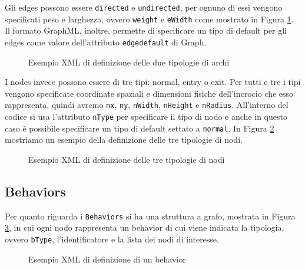 Gli edges possono essere \texttt{directed} e \texttt{undirected}, per ognuno di essi vengono specificati peso e larghezza, ovvero \texttt{weight} e \texttt{eWidth} come mostrato in Figura \ref{fig:xml-edges}. Il formato GraphML, inoltre, permette di specificare un tipo di default per gli edges come valore dell'attributo \texttt{edgedefault} di Graph.

\begin{figure}[htbp]
\centering
\caption{Esempio XML di definizione delle due tipologie di archi}
\label{fig:xml-edges}
\end{figure}

I nodes invece possono essere di tre tipi: normal, entry o exit. Per tutti e tre i tipi vengono specificate coordinate spaziali e dimensioni fisiche dell'incrocio che esso rappresenta, quindi avremo \texttt{nx}, \texttt{ny}, \texttt{nWidth}, \texttt{nHeight} e \texttt{nRadius}. All'interno del codice si usa l'attributo \texttt{nType} per specificare il tipo di nodo e anche in questo caso è possibile specificare un tipo di default settato a \texttt{normal}. In Figura \ref{fig:xml-nodes} mostriamo un esempio della definizione delle tre tipologie di nodi.  

\begin{figure}[htbp]
\centering
\caption{Esempio XML di definizione delle tre tipologie di nodi}
\label{fig:xml-nodes}
\end{figure}


\subsection{Behaviors}

Per quanto riguarda i \texttt{Behaviors} si ha una struttura a grafo, mostrata in Figura \ref{fig:xml-behaviors}, in cui ogni nodo rappresenta un behavior di cui viene indicata la tipologia, ovvero \texttt{bType}, l'identificatore e la lista dei nodi di interesse.

\begin{figure}[htbp]
\centering
\caption{Esempio XML di definizione di un behavior}
\label{fig:xml-behaviors}
\end{figure}


